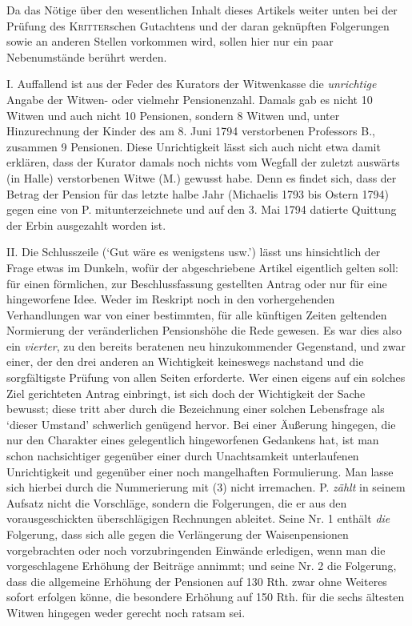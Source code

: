 \noindent\hspace*{\parindent}Da das Nötige über den wesentlichen Inhalt dieses Artikels weiter unten bei der Prüfung des \textsc{Kritter}schen Gutachtens und der daran geknüpften Folgerungen sowie an anderen Stellen vorkommen wird, sollen hier nur ein paar Nebenumstände berührt werden.

I. Auffallend ist aus der Feder des Kurators der Witwenkasse die \textit{unrichtige} Angabe der Witwen- oder vielmehr Pensionenzahl. Damals gab es nicht 10 Witwen und auch nicht 10 Pensionen, sondern 8 Witwen und, unter Hinzurechnung der Kinder des am 8. Juni 1794 verstorbenen Professors B., zusammen 9 Pensionen. Diese Unrichtigkeit lässt sich auch nicht etwa damit erklären, dass der Kurator damals noch nichts vom Wegfall der zuletzt auswärts (in Halle) verstorbenen Witwe (M.) gewusst habe. Denn es findet sich, dass der Betrag der Pension für das letzte halbe Jahr (Michaelis 1793 bis Ostern 1794) gegen eine von P. mitunterzeichnete und auf den 3. Mai 1794 datierte Quittung der Erbin ausgezahlt worden ist.

II. Die Schlusszeile (‘Gut wäre es wenigstens usw.’) lässt uns hinsichtlich der Frage etwas im Dunkeln, wofür der abgeschriebene Artikel eigentlich gelten soll: für einen förmlichen, zur Beschlussfassung gestellten Antrag oder nur für eine hingeworfene Idee. Weder im Reskript noch in den vorhergehenden Verhandlungen war von einer bestimmten, für alle künftigen Zeiten geltenden Normierung der veränderlichen Pensionshöhe die Rede gewesen. Es war dies also ein \textit{vierter}, zu den bereits beratenen neu hinzukommender Gegenstand, und zwar einer, der den drei anderen an Wichtigkeit keineswegs nachstand und die sorgfältigste Prüfung von allen Seiten erforderte. Wer einen eigens auf ein solches Ziel gerichteten Antrag einbringt, ist sich doch der Wichtigkeit der Sache bewusst; diese tritt aber durch die Bezeichnung einer solchen Lebensfrage als ‘dieser Umstand’ schwerlich genügend hervor. Bei einer Äußerung hingegen, die nur den Charakter eines gelegentlich hingeworfenen Gedankens hat, ist man schon nachsichtiger gegenüber einer durch Unachtsamkeit unterlaufenen Unrichtigkeit und gegenüber einer noch mangelhaften Formulierung. Man lasse sich hierbei durch die Nummerierung mit (3) nicht irremachen. P. \textit{zählt} in seinem Aufsatz nicht die Vorschläge, sondern die Folgerungen, die er aus den vorausgeschickten überschlägigen Rechnungen ableitet. Seine Nr. 1 enthält \textit{die} Folgerung, dass sich alle gegen die Verlängerung der Waisenpensionen vorgebrachten oder noch vorzubringenden Einwände erledigen, wenn man die vorgeschlagene Erhöhung der Beiträge annimmt; und seine Nr. 2 die Folgerung, dass die allgemeine Erhöhung der Pensionen auf 130 Rth. zwar ohne Weiteres sofort erfolgen könne, die besondere Erhöhung auf 150 Rth. für die sechs ältesten Witwen hingegen weder gerecht noch ratsam sei.

